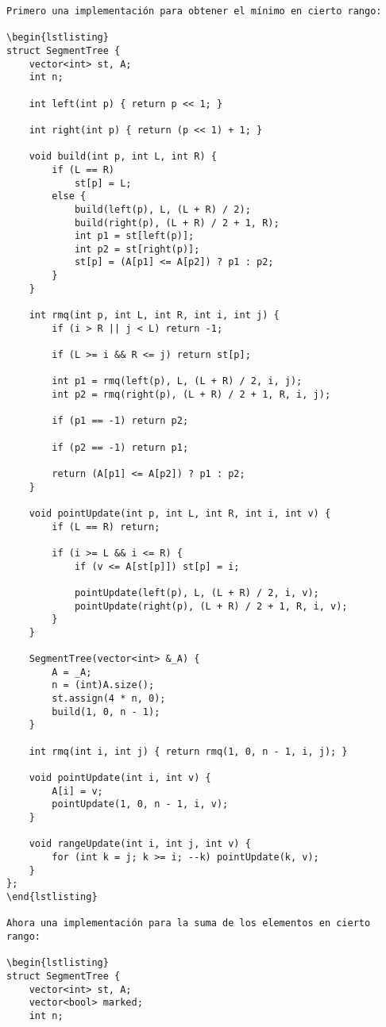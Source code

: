 \documentclass[11pt]{article}
\begin{document}
\begin{verbatim}
Primero una implementación para obtener el mínimo en cierto rango:

\begin{lstlisting}
struct SegmentTree {
    vector<int> st, A;
    int n;

    int left(int p) { return p << 1; }

    int right(int p) { return (p << 1) + 1; }

    void build(int p, int L, int R) {
        if (L == R)
            st[p] = L;
        else {
            build(left(p), L, (L + R) / 2);
            build(right(p), (L + R) / 2 + 1, R);
            int p1 = st[left(p)];
            int p2 = st[right(p)];
            st[p] = (A[p1] <= A[p2]) ? p1 : p2;
        }
    }

    int rmq(int p, int L, int R, int i, int j) {
        if (i > R || j < L) return -1;

        if (L >= i && R <= j) return st[p];

        int p1 = rmq(left(p), L, (L + R) / 2, i, j);
        int p2 = rmq(right(p), (L + R) / 2 + 1, R, i, j);

        if (p1 == -1) return p2;

        if (p2 == -1) return p1;

        return (A[p1] <= A[p2]) ? p1 : p2;
    }

    void pointUpdate(int p, int L, int R, int i, int v) {
        if (L == R) return;

        if (i >= L && i <= R) {
            if (v <= A[st[p]]) st[p] = i;
            
            pointUpdate(left(p), L, (L + R) / 2, i, v);
            pointUpdate(right(p), (L + R) / 2 + 1, R, i, v);
        }
    }

    SegmentTree(vector<int> &_A) {
        A = _A;
        n = (int)A.size();
        st.assign(4 * n, 0);
        build(1, 0, n - 1);
    }

    int rmq(int i, int j) { return rmq(1, 0, n - 1, i, j); }

    void pointUpdate(int i, int v) {
        A[i] = v;
        pointUpdate(1, 0, n - 1, i, v);
    }

    void rangeUpdate(int i, int j, int v) {
        for (int k = j; k >= i; --k) pointUpdate(k, v);
    }
};
\end{lstlisting}

Ahora una implementación para la suma de los elementos en cierto rango:

\begin{lstlisting}
struct SegmentTree {
    vector<int> st, A;
    vector<bool> marked;
    int n;


\end{verbatim}
\end{document}
